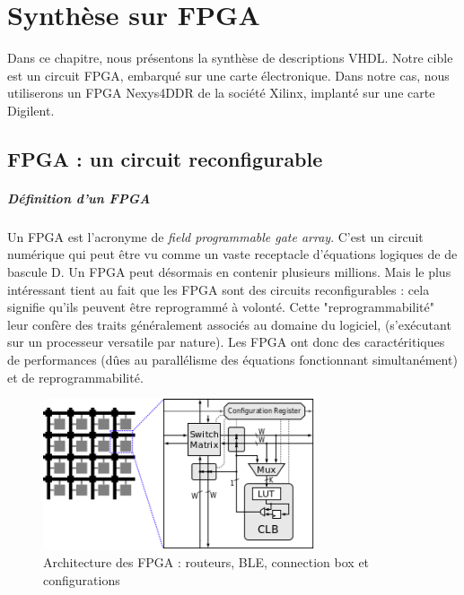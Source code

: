 \chapter{Synthèse sur FPGA}

Dans ce chapitre, nous présentons la synthèse de descriptions VHDL. Notre cible est un circuit FPGA, embarqué sur une carte électronique.
Dans notre cas, nous utiliserons un FPGA Nexys4DDR de la société Xilinx, implanté sur une carte Digilent.

\section{FPGA : un circuit reconfigurable}
\paragraph{Définition d'un FPGA} Un FPGA est l'acronyme de \textit{field programmable gate array}. C'est un circuit numérique qui peut être vu comme un vaste receptacle d'équations logiques de de bascule D.
Un FPGA peut désormais en contenir plusieurs millions. Mais le plus intéressant tient au fait que les FPGA sont des circuits reconfigurables :
cela signifie qu'ils peuvent être reprogrammé à volonté. Cette "reprogrammabilité" leur confère des traits généralement associés au domaine du logiciel,
(s'exécutant sur un processeur versatile par nature). Les FPGA ont donc des caractéritiques de performances (dûes au parallélisme des équations fonctionnant simultanément)
et de reprogrammabilité.\\


\begin{figure}[h!]
  \centering
  \includegraphics[width=8cm]{./figures/fpga_arch.png}
  \caption{Architecture des FPGA : routeurs, BLE, connection box et configurations}
  \label{fpga_arch}
\end{figure}

